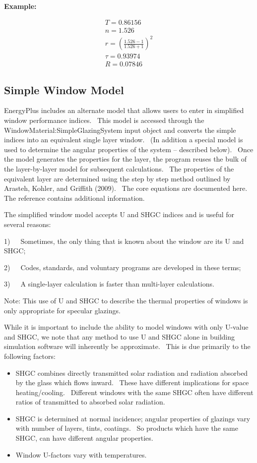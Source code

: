 \textbf{Example:}

\begin{equation}
  \begin{array}{l}
    T = 0.86156 \\
    n = 1.526 \\
    r = \left( \frac{1.526 - 1}{1.526 + 1} \right)^2 \\
    \tau = 0.93974 \\
    R = 0.07846
  \end{array}
\end{equation}

\subsection{Simple Window Model}\label{simple-window-model}

EnergyPlus includes an alternate model that allows users to enter in simplified window performance indices.~ This model is accessed through the WindowMaterial:SimpleGlazingSystem input object and converts the simple indices into an equivalent single layer window.~ (In addition a special model is used to determine the angular properties of the system -- described below).~ Once the model generates the properties for the layer, the program reuses the bulk of the layer-by-layer model for subsequent calculations.~ The properties of the equivalent layer are determined using the step by step method outlined by Arasteh, Kohler, and Griffith (2009).~ The core equations are documented here.~ The reference contains additional information.

The simplified window model accepts U and SHGC indices and is useful for several reasons:

1)~~~Sometimes, the only thing that is known about the window are its U and SHGC;

2)~~~Codes, standards, and voluntary programs are developed in these terms;

3)~~~A single-layer calculation is faster than multi-layer calculations.

Note: This use of U and SHGC to describe the thermal properties of windows is only appropriate for specular glazings.

While it is important to include the ability to model windows with only U-value and SHGC, we note that any method to use U and SHGC alone in building simulation software will inherently be approximate.~ This is due primarily to the following factors:

\begin{itemize}
\item
  SHGC combines directly transmitted solar radiation and radiation absorbed by the glass which flows inward.~ These have different implications for space heating/cooling.~ Different windows with the same SHGC often have different ratios of transmitted to absorbed solar radiation.
\item
  SHGC is determined at normal incidence; angular properties of glazings vary with number of layers, tints, coatings.~ So products which have the same SHGC, can have different angular properties.
\item
  Window U-factors vary with temperatures.
\end{itemize}

